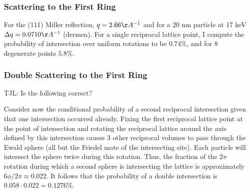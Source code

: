\documentclass[11pt]{amsart}
\begin{document}
\subsubsection*{Scattering to the First Ring}
For the (111) Miller reflection, $q = 2.66 \AA^{-1}$ and for a 20 nm particle at 17 keV $\Delta q = 0.0710 \AA^{-1}$ (dermen). For a single reciprocal lattice point, I compute the probability of intersection over uniform rotations to be $0.74\%$, and for 8 degenerate points $5.8\%$.

\subsubsection*{Double Scattering to the First Ring}
TJL: Is the following correct?

Consider now the conditional probability of a second reciprocal intersection given that one intersection occurred already. Fixing the first reciprocal lattice point at the point of intersection and rotating the reciprocal lattice around the axis defined by this intersection causes 3 other reciprocal volumes to pass through the Ewald sphere (all but the Friedel mate of the intersecting site). Each particle will intersect the sphere twice during this rotation. Thus, the fraction of the $2 \pi$ rotation during which a second sphere is intersecting the lattice is approximately $ 6 \phi / 2 \pi \approx 0.022$. It follows that the probability of a double intersection is $0.058 \cdot 0.022 = 0.1276 \%$.
\end{document}
